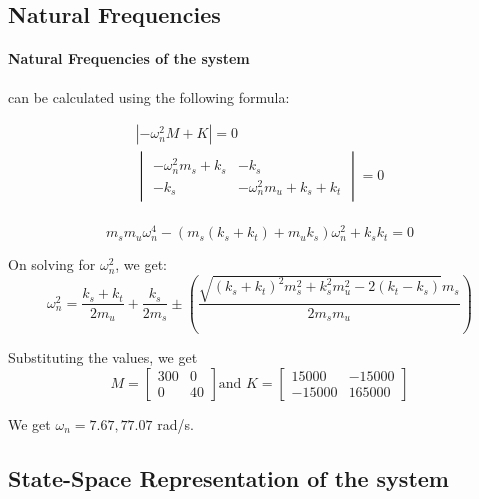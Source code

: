 \documentclass[12pt, a4paper, oneside]{report}
\begin{document}
\subsection{Natural Frequencies}

\paragraph[]{Natural Frequencies of the system} can be calculated using the following formula:


\begin{align}
        \left\lvert -\omega_n^2 M + K  \right\rvert = 0 \\
        \begin{vmatrix}
            -\omega_n^2 m_s + k_s & -k_s \\
            -k_s & -\omega_n^2 m_u + k_s + k_t
        \end{vmatrix} \nonumber
        = 0 \\
\end{align}


\begin{equation}
    m_s m_u \omega_n^4 -( m_s(k_s + k_t) + m_u k_s) \omega_n^2 + k_s k_t = 0 
\end{equation}

On solving for $\omega_n^2$, we get:
\begin{equation}
    \omega_n^2 = \frac{k_s +k_t}{2m_u} + \frac{k_s}{2 m_s} \pm \left( \frac{\sqrt{(k_s +k_t)^2 m_s^2 + k_s^2 m_u^2 - 2( k_t - k_s)}m_s}{2 m_s m_u} \right)
\end{equation}

Substituting the values, we get 
\begin{equation}
    M = \begin{bmatrix}
        300 & 0 \\
        0 & 40
        \end{bmatrix} \text{and } K = \begin{bmatrix}
        15000 & -15000 \\
        -15000 & 165000
        \end{bmatrix}
        \nonumber
\end{equation}


We get $ \omega_n = 7.67 , 77.07$ rad/s.

\subsection{State-Space Representation of the system}
\end{document}
